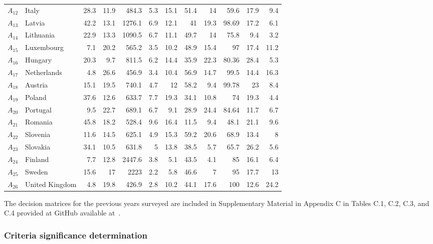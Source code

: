 \documentclass[5p,times]{elsarticle}
\begin{document}
\begin{table}[ht!]
{\begin{tabular}{llrrrrrrrrrr}
$A_{12}$ & Italy & 28.3 & 11.9 & 484.3 & 5.3 & 15.1 & 51.4 & 14 & 59.6 & 17.9 & 9.4 \\
$A_{13}$ & Latvia & 42.2 & 13.1 & 1276.1 & 6.9 & 12.1 & 41 & 19.3 & 98.69 & 17.2 & 6.1 \\
$A_{14}$ & Lithuania & 22.9 & 13.3 & 1090.5 & 6.7 & 11.1 & 49.7 & 14 & 75.8 & 9.4 & 3.2 \\
$A_{15}$ & Luxembourg & 7.1 & 20.2 & 565.2 & 3.5 & 10.2 & 48.9 & 15.4 & 97 & 17.4 & 11.2 \\
$A_{16}$ & Hungary & 20.3 & 9.7 & 811.5 & 6.2 & 14.4 & 35.9 & 22.3 & 80.36 & 28.4 & 5.3 \\
$A_{17}$ & Netherlands & 4.8 & 26.6 & 456.9 & 3.4 & 10.4 & 56.9 & 14.7 & 99.5 & 14.4 & 16.3 \\
$A_{18}$ & Austria & 15.1 & 19.5 & 740.1 & 4.7 & 12 & 58.2 & 9.4 & 99.78 & 23 & 8.4 \\
$A_{19}$ & Poland & 37.6 & 12.6 & 633.7 & 7.7 & 19.3 & 34.1 & 10.8 & 74 & 19.3 & 4.4 \\
$A_{20}$ & Portugal & 9.5 & 22.7 & 689.1 & 6.7 & 9.1 & 28.9 & 24.4 & 84.64 & 11.7 & 6.7 \\
$A_{21}$ & Romania & 45.8 & 18.2 & 528.4 & 9.6 & 16.4 & 11.5 & 9.4 & 48.1 & 21.1 & 9.6 \\
$A_{22}$ & Slovenia & 11.6 & 14.5 & 625.1 & 4.9 & 15.3 & 59.2 & 20.6 & 68.9 & 13.4 & 8 \\
$A_{23}$ & Slovakia & 34.1 & 10.5 & 631.8 & 5 & 13.8 & 38.5 & 5.7 & 65.7 & 26.2 & 5.6 \\
$A_{24}$ & Finland & 7.7 & 12.8 & 2447.6 & 3.8 & 5.1 & 43.5 & 4.1 & 85 & 16.1 & 6.4 \\
$A_{25}$ & Sweden & 15.6 & 17 & 2223 & 2.2 & 5.8 & 46.6 & 7 & 95 & 17.7 & 13 \\
$A_{26}$ & United Kingdom & 4.8 & 19.8 & 426.9 & 2.8 & 10.2 & 44.1 & 17.6 & 100 & 12.6 & 24.2 \\ \bottomrule
\end{tabular}
}
\end{table}
%
The decision matrices for the previous years surveyed are included in Supplementary Material in Appendix C in Tables C.1, C.2, C.3, and C.4 provided at GitHub available at~\cite{dariagithub2022}.

\subsubsection{Criteria significance determination}
\end{document}
